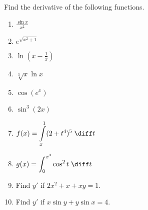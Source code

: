 
Find the derivative of the following functions.
\begin{multicols}{2}
\begin{enumerate}[ref={\fcProblemRef}]
\item ${\displaystyle \frac{\sin x}{x^2}}$

\item ${\displaystyle e^{\sqrt{x^2 + 1}}}$

\item ${\displaystyle \ln \left(x-\frac{1}{x} \right)}$

\item ${\displaystyle \sqrt[3]{x} \ln x}$

\item ${\displaystyle \cos(e^x)}$

\item ${\displaystyle \sin^3(2x)}$

\item\label{problemDifferentiateFTC1int_x^1(2+t^4)^5dt}  ${\displaystyle f(x) = \int\limits_x^1 (2+t^4)^5 \; \diff t}$

\item ${\displaystyle g(x) = \int_{0}^{x^3} \cos^2 t \; \diff t}$

\item Find $y'$ if $2x^2 + x + xy = 1$.

\item Find $y'$ if $x \sin y + y \sin x = 4$.

\end{enumerate}
\end{multicols}
